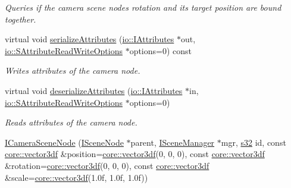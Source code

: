 \begin{DoxyCompactItemize}
\begin{DoxyCompactList}\small\item\em Queries if the camera scene node\textquotesingle{}s rotation and its target position are bound together. \end{DoxyCompactList}\item 
\mbox{\label{classirr_1_1scene_1_1ICameraSceneNode_a0a78a29638be1665ee5dba22c2c3b846}} 
virtual void \hyperlink{classirr_1_1scene_1_1ICameraSceneNode_a0a78a29638be1665ee5dba22c2c3b846}{serialize\+Attributes} (\hyperlink{classirr_1_1io_1_1IAttributes}{io\+::\+I\+Attributes} $\ast$out, \hyperlink{structirr_1_1io_1_1SAttributeReadWriteOptions}{io\+::\+S\+Attribute\+Read\+Write\+Options} $\ast$options=0) const
\begin{DoxyCompactList}\small\item\em Writes attributes of the camera node. \end{DoxyCompactList}\item 
\mbox{\label{classirr_1_1scene_1_1ICameraSceneNode_a0df881cb5e2a55562399281061151ae8}} 
virtual void \hyperlink{classirr_1_1scene_1_1ICameraSceneNode_a0df881cb5e2a55562399281061151ae8}{deserialize\+Attributes} (\hyperlink{classirr_1_1io_1_1IAttributes}{io\+::\+I\+Attributes} $\ast$in, \hyperlink{structirr_1_1io_1_1SAttributeReadWriteOptions}{io\+::\+S\+Attribute\+Read\+Write\+Options} $\ast$options=0)
\begin{DoxyCompactList}\small\item\em Reads attributes of the camera node. \end{DoxyCompactList}\item 
\mbox{\label{classirr_1_1scene_1_1ICameraSceneNode_a80e2a6e96feaf3191129eb6abefebc6f}} 
\hyperlink{classirr_1_1scene_1_1ICameraSceneNode_a80e2a6e96feaf3191129eb6abefebc6f}{I\+Camera\+Scene\+Node} (\hyperlink{classirr_1_1scene_1_1ISceneNode}{I\+Scene\+Node} $\ast$parent, \hyperlink{classirr_1_1scene_1_1ISceneManager}{I\+Scene\+Manager} $\ast$mgr, \hyperlink{namespaceirr_ac66849b7a6ed16e30ebede579f9b47c6}{s32} id, const \hyperlink{namespaceirr_1_1core_ae6e2b2a6c552833ebbd5b7463d03586b}{core\+::vector3df} \&position=\hyperlink{namespaceirr_1_1core_ae6e2b2a6c552833ebbd5b7463d03586b}{core\+::vector3df}(0, 0, 0), const \hyperlink{namespaceirr_1_1core_ae6e2b2a6c552833ebbd5b7463d03586b}{core\+::vector3df} \&rotation=\hyperlink{namespaceirr_1_1core_ae6e2b2a6c552833ebbd5b7463d03586b}{core\+::vector3df}(0, 0, 0), const \hyperlink{namespaceirr_1_1core_ae6e2b2a6c552833ebbd5b7463d03586b}{core\+::vector3df} \&scale=\hyperlink{namespaceirr_1_1core_ae6e2b2a6c552833ebbd5b7463d03586b}{core\+::vector3df}(1.\+0f, 1.\+0f, 1.\+0f))

\end{DoxyCompactItemize}
